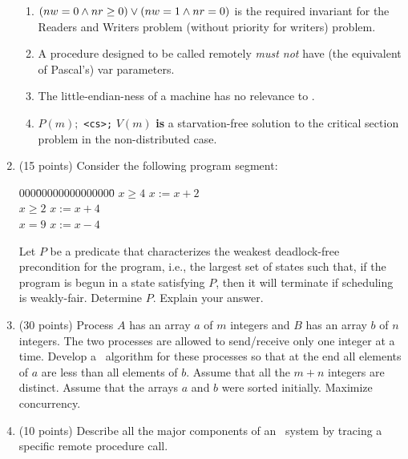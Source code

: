 \begin{enumerate}
\begin{enumerate}
\item
$(nw = 0 \wedge nr \ge 0) \vee (nw = 1 \wedge nr = 0)$ is the
required invariant for the Readers and Writers problem (without
priority for writers) problem.

\item

A procedure designed to be called remotely {\em must not} have
(the equivalent of Pascal's) var parameters.

\item
The little-endian-ness of a machine has no relevance to \RPC.

\item 
$P(m);$ \verb|<cs>;| $V(m)$ {\bf is} a starvation-free
solution to the critical section problem in the non-distributed case.

\end{enumerate}


\item (15 points)
Consider the following program segment:

\begin{tabbing}
000\=00000000000000\=\kill
\co\> \lb \await\quad $x \geq 4$ \>\ra\quad $x := x + 2$ \rb\\
\pa\> \lb \await\quad $x \geq 2$ \>\ra\quad $x := x + 4$ \rb\\
\pa\> \lb \await\quad $x = 9$ \>\ra\quad $x := x - 4$ \rb\\
\oc
\end{tabbing}

Let $P$ be a predicate that characterizes the weakest deadlock-free
precondition for the program, i.e., the largest set of states such
that, if the program is begun in a state satisfying $P$, then it will
terminate if scheduling is weakly-fair.  Determine $P$.  Explain your
answer.


\item (30 points)
Process $A$ has an array $a$ of $m$ integers and $B$ has an array $b$
of $n$ integers.  The two processes are allowed to send/receive only
one integer at a time.  Develop a \CSP\ algorithm for these processes
so that at the end all elements of $a$ are less than all elements of
$b$.  Assume that all the $m+n$ integers are distinct.  Assume that
the arrays $a$ and $b$ were sorted initially.  Maximize concurrency.

\item (10 points)
Describe all the major components of an \RPC\ system by
tracing a specific remote procedure call.

\end{enumerate}

